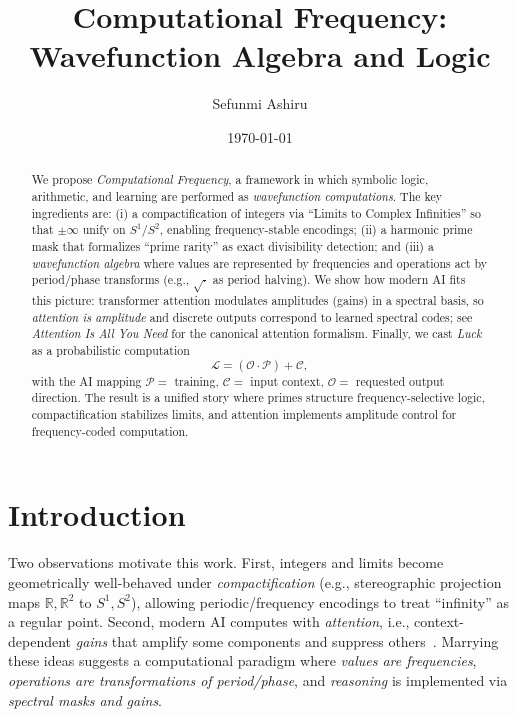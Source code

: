 \documentclass[12pt]{article}
\newcommand{\R}{\mathbb{R}}
\newcommand{\Luck}{\mathcal{L}}
\newcommand{\Opp}{\mathcal{O}}
\newcommand{\Prep}{\mathcal{P}}
\newcommand{\Circ}{\mathcal{C}}
\begin{document}
\title{Computational Frequency: Wavefunction Algebra and Logic}

\author{Sefunmi Ashiru}
\date{\today}

\maketitle

\begin{abstract}
We propose \emph{Computational Frequency}, a framework in which symbolic logic, arithmetic, and learning are performed as \emph{wavefunction computations}. The key ingredients are: (i) a compactification of integers via “Limits to Complex Infinities” so that $\pm\infty$ unify on $S^1/S^2$, enabling frequency-stable encodings; (ii) a harmonic prime mask that formalizes “prime rarity” as exact divisibility detection; and (iii) a \emph{wavefunction algebra} where values are represented by frequencies and operations act by period/phase transforms (e.g., $\sqrt{\cdot}$ as period halving). We show how modern AI fits this picture: transformer attention modulates amplitudes (gains) in a spectral basis, so \emph{attention is amplitude} and discrete outputs correspond to learned spectral codes; see \emph{Attention Is All You Need} for the canonical attention formalism. Finally, we cast \emph{Luck} as a probabilistic computation
\[
\Luck=(\Opp\cdot\Prep)+\Circ,
\]
with the AI mapping \(\Prep=\) training, \(\Circ=\) input context, \(\Opp=\) requested output direction. The result is a unified story where primes structure frequency-selective logic, compactification stabilizes limits, and attention implements amplitude control for frequency-coded computation.
\end{abstract}


\section{Introduction}
Two observations motivate this work. First, integers and limits become geometrically well-behaved under \emph{compactification} (e.g., stereographic projection maps $\R,\R^2$ to $S^1,S^2$), allowing periodic/frequency encodings to treat “infinity” as a regular point. Second, modern AI computes with \emph{attention}, i.e., context-dependent \emph{gains} that amplify some components and suppress others~\citep{vaswani2017attention}. Marrying these ideas suggests a computational paradigm where \emph{values are frequencies}, \emph{operations are transformations of period/phase}, and \emph{reasoning} is implemented via \emph{spectral masks and gains}.
\end{document}
